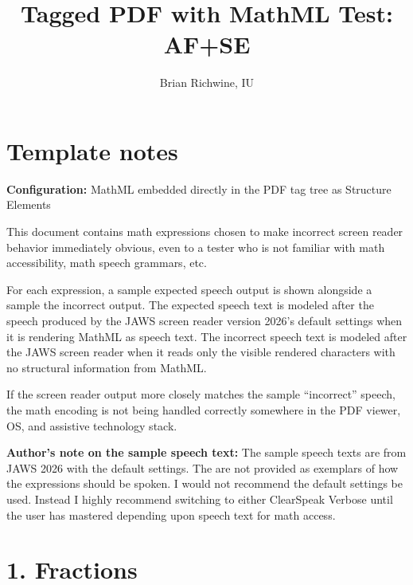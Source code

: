 \documentclass{article}
\title{Tagged PDF with MathML Test: AF+SE}
\author{Brian Richwine, IU}
\date{}
\begin{document}
\raggedright

\maketitle

\section*{Template notes}

\textbf{Configuration:} MathML embedded directly in the PDF tag tree as Structure Elements


This document contains math expressions chosen to make incorrect screen 
reader behavior immediately obvious, even to a tester who is not familiar 
with math accessibility, math speech grammars, etc. 

For each expression, a sample expected speech output is shown alongside 
a sample the incorrect output. The expected speech text is modeled after 
the speech produced by the JAWS screen reader version 2026's default 
settings when it is rendering MathML as speech text. The incorrect speech 
text is modeled after the JAWS screen reader when it reads only the visible 
rendered characters with no structural information from MathML. 

If the screen reader output more closely matches the sample ``incorrect'' 
speech, the math encoding is not being handled correctly somewhere in 
the PDF viewer, OS, and assistive technology stack. 

\textbf{Author's note on the sample speech text:} The sample speech texts 
are from JAWS 2026 with the default settings. The are not provided as 
exemplars of how the expressions should be spoken. I would not recommend 
the default settings be used. Instead I highly recommend switching to 
either ClearSpeak Verbose until the user has mastered depending upon speech 
text for math access. 

\section*{1. Fractions}
\end{document}
